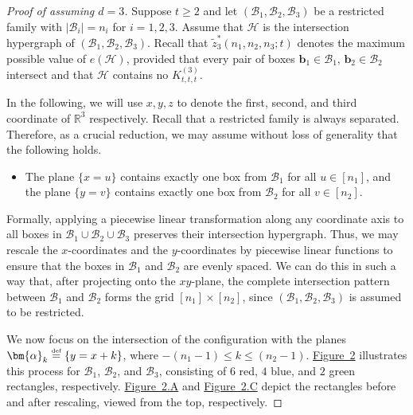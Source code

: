 \documentclass[11pt]{article}
\theoremstyle{definition}
\newcommand*{\eqdef}{\stackrel{\mbox{\normalfont\tiny def}}{=}} %
\newcommand*{\cH}{\mathcal{H}}
\newcommand*{\cB}{\mathcal{B}}
\newcommand*{\wz}{\widetilde{z}}
\begin{document}
\begin{proof}[Proof of  assuming $d = 3$]
    Suppose $t \ge 2$ and let $(\cB_1, \cB_2, \cB_3)$ be a restricted family with $|\cB_i| = n_i$ for $i = 1, 2, 3$. Assume that $\cH$ is the intersection hypergraph of $(\cB_1, \cB_2, \cB_3)$. Recall that $\wz_3^*(n_1, n_2, n_3; t)$ denotes the maximum possible value of $e(\cH)$, provided that every pair of boxes $\bm{b}_1 \in \cB_1, \, \bm{b}_2 \in \cB_2$ intersect and that $\cH$ contains no $K_{t, t, t}^{(3)}$. 
    
    In the following, we will use $x,y,z$ to denote the first, second, and third coordinate of $\mathbb{R}^3$ respectively.
    Recall that a restricted family is always separated. Therefore, 
    as a crucial reduction,
    we may assume without loss of generality that the following holds. 
    \vspace{-0.5em}
    \begin{itemize}
        \item The plane $\{x = u\}$ contains exactly one box from $\cB_1$ for all $u\in [n_1]$, and the plane $\{y = v\}$ contains exactly one box from $\cB_2$ for all $v\in [n_2]$.
    \end{itemize}
    \vspace{-0.5em}

    Formally, applying a piecewise linear transformation along any coordinate axis to all boxes in $\mathcal{B}_1 \cup \mathcal{B}_2 \cup \mathcal{B}_3$ preserves their intersection hypergraph.
    Thus, we may rescale the $x$-coordinates and the $y$-coordinates by piecewise linear functions to ensure that the 
    boxes in $\mathcal{B}_1$ and $\mathcal{B}_2$ are evenly spaced. We can do this in such a way
    that, after projecting onto the $xy$-plane, the complete intersection pattern between $\mathcal{B}_1$ and $\mathcal{B}_2$ forms the grid $[n_1] \times [n_2]$, since $(\cB_1, \cB_2, \cB_3)$ is assumed to be restricted. 
    
    We now focus on the intersection of the configuration with the planes $\bm{\alpha}_k \eqdef \{y = x + k\}$,
    where $-(n_1-1) \le k \le (n_2-1)$. \hyperlink{figtwo}{Figure~2} illustrates this process for $\mathcal{B}_1$, $\mathcal{B}_2$, and $\mathcal{B}_3$, consisting of $6$ red, $4$ blue, and $2$ green rectangles, respectively. \hyperlink{figtwoA}{Figure~2.A} and \hyperlink{figtwoC}{Figure~2.C} depict the rectangles before and after rescaling, viewed from the top, respectively. 


\end{proof}
\end{document}
